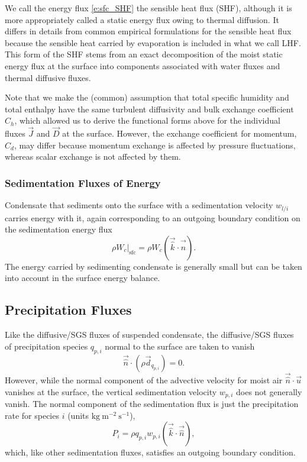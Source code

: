 \documentclass{report}
\begin{document}
We call the energy flux \eqref{e:sfc_SHF} the sensible heat flux (SHF), although it is more appropriately called a static energy flux owing to thermal diffusion. It differs in details from common empirical formulations for the sensible heat flux because the sensible heat carried by evaporation is included in what we call LHF. This form of the SHF stems from an exact decomposition of the moist static energy flux at the surface into components associated with water fluxes and thermal diffusive fluxes.

Note that we make the (common) assumption that total specific humidity and total enthalpy have the same turbulent diffusivity and bulk exchange coefficient $C_h$, which allowed us to derive the functional forms above for the individual fluxes $\vec{J}$ and $\vec{D}$ at the surface.  However, the exchange coefficient for momentum, $C_d$, may differ because momentum exchange is affected by pressure fluctuations, whereas scalar exchange is not affected by them.

\subsubsection{Sedimentation Fluxes of Energy}

Condensate that sediments onto the surface with a sedimentation velocity $w_{l/i}$ carries energy with it, again corresponding to an outgoing boundary condition on the sedimentation energy flux
\[
\left. \rho W_c\right|_\mathrm{sfc} = \rho W_c (\vec{\hat k} \cdot \vec{\hat n}).
\]
The energy carried by sedimenting condensate is generally small but can be taken into account in the surface energy balance.

\subsection{Precipitation Fluxes}

Like the diffusive/SGS fluxes of suspended condensate, the diffusive/SGS fluxes of precipitation species $q_{p, i}$ normal to the surface are taken to vanish
\begin{equation}\label{e:sfc_precip}
 \vec{\hat n} \cdot (\rho \vec{d}_{q_{p, i}}) = 0.
\end{equation} 
However, while the normal component of the advective velocity for moist air $\vec{\hat n} \cdot \vec{u}$ vanishes at the surface, the vertical sedimentation velocity $w_{p,i}$ does not generally vanish. The normal component of the sedimentation flux is just the precipitation rate for species $i$ (units $\mathrm{kg~m^{-2}~s^{-1}}$),
\begin{equation}
    P_i = \rho q_{p, i} w_{p, i} (\vec{\hat k} \cdot \vec{\hat n}),
\end{equation}
which, like other sedimentation fluxes, satisfies an outgoing boundary condition. 
\end{document}
